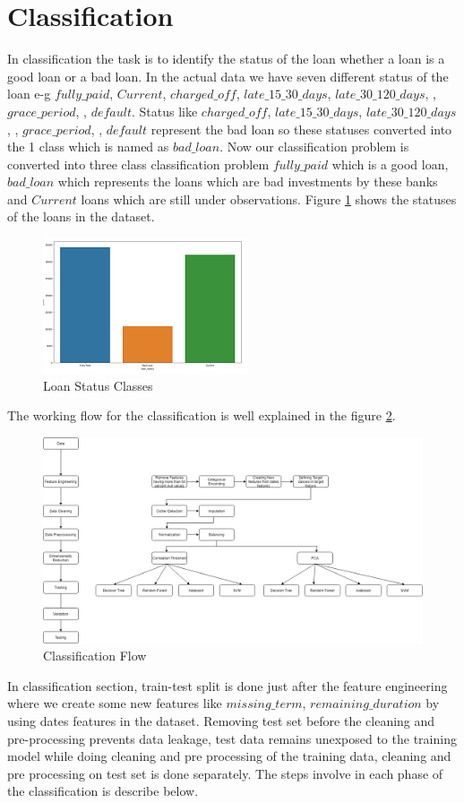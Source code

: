 \documentclass[12pt]{article}
\begin{document}
\section{Classification}
In classification the task is to identify the status of the loan whether a loan is a good loan or a bad loan. In the actual data we have seven different status of the loan e-g $fully\_paid$, $Current$, $charged\_off$, $late\_15\_30\_days$, $late\_30\_120\_days$, , $grace\_period$, , $default$. Status like $charged\_off$, $late\_15\_30\_days$, $late\_30\_120\_days$, , $grace\_period$, , $default$ represent the bad loan so these statuses converted into the 1 class which is named as $bad\_loan$. Now our classification problem is converted into three class classification problem $fully\_paid$ which is a good loan, $bad\_loan$ which represents the loans which are bad investments by these banks and $Current$ loans which are still under observations. Figure \ref{fig:classes} shows the statuses of the loans in the dataset.
\begin{figure}[h!]
	\centering
	\includegraphics{classes.png}
	\caption{Loan Status Classes}
	\label{fig:classes}
\end{figure}
The working flow for the classification is well explained in the figure \ref{fig:c_flow}.
\begin{figure}[h!]
	\centering
	\includegraphics[width=\textwidth]{c_flow.png}
	\caption{Classification Flow}
	\label{fig:c_flow}
\end{figure}
In classification section, train-test split is done just after the feature engineering where we create some new features like $missing\_term$, $remaining\_duration$ by using dates features in the dataset. Removing test set before the cleaning and pre-processing prevents data leakage, test data remains unexposed to the training model while doing cleaning and pre processing of the training data, cleaning and pre processing on test set is done separately. The steps involve in each phase of the classification is describe below.
\end{document}
